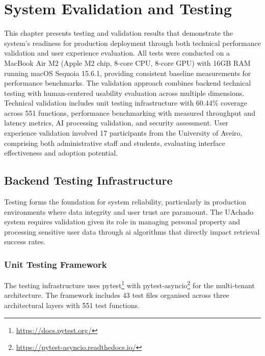 \chapter{System Evalidation and Testing}
\label{chapter:testing_validation}

This chapter presents testing and validation results that demonstrate the system's readiness for production deployment through both technical performance validation and user experience evaluation. All tests were conducted on a MacBook Air M2 (Apple M2 chip, 8-core CPU, 8-core GPU) with 16GB RAM running macOS Sequoia 15.6.1, providing consistent baseline measurements for performance benchmarks. The validation approach combines backend technical testing with human-centered usability evaluation across multiple dimensions. Technical validation includes unit testing infrastructure with 60.44\% coverage across 551 functions, performance benchmarking with measured throughput and latency metrics, AI processing validation, and security assessment. User experience validation involved 17 participants from the University of Aveiro, comprising both administrative staff and students, evaluating interface effectiveness and adoption potential.


\section{Backend Testing Infrastructure} \label{section:backend_testing}

Testing forms the foundation for system reliability, particularly in production environments where data integrity and user trust are paramount. The UAchado system requires validation given its role in managing personal property and processing sensitive user data through \ac{ai} algorithms that directly impact retrieval success rates.

\subsection{Unit Testing Framework} \label{subsection:unit_testing_framework}

The testing infrastructure uses pytest\footnote{\url{https://docs.pytest.org/}} with pytest-asyncio\footnote{\url{https://pytest-asyncio.readthedocs.io/}} for the multi-tenant architecture. The framework includes 43 test files organised across three architectural layers with 551 test functions.

